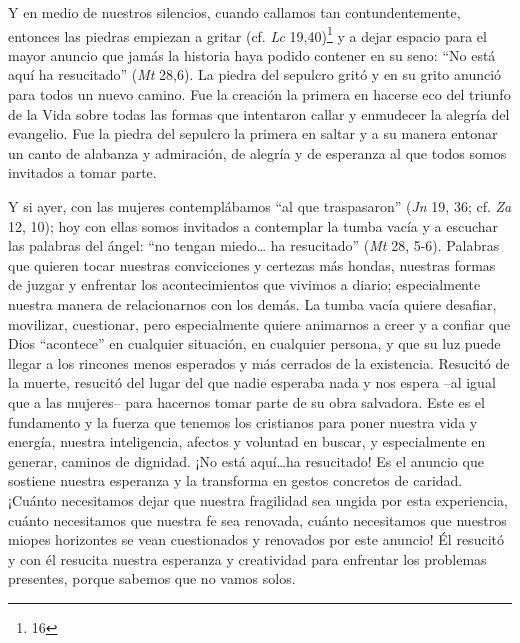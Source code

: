 			\begin{body}Y en medio de nuestros silencios, cuando callamos tan contundentemente, entonces las piedras empiezan a gritar (cf. \textit{Lc} 19,40)\footnote{16} y a dejar espacio para el mayor anuncio que jamás la historia haya podido contener en su seno: “No está aquí ha resucitado” (\textit{Mt} 28,6). La piedra del sepulcro gritó y en su grito anunció para todos un nuevo camino. Fue la creación la primera en hacerse eco del triunfo de la Vida sobre todas las formas que intentaron callar y enmudecer la alegría del evangelio. Fue la piedra del sepulcro la primera en saltar y a su manera entonar un canto de alabanza y admiración, de alegría y de esperanza al que todos somos invitados a tomar parte. \end{body}
			
			\begin{body}Y si ayer, con las mujeres contemplábamos “al que traspasaron” (\textit{Jn} 19, 36; cf. \textit{Za} 12, 10); hoy con ellas somos invitados a contemplar la tumba vacía y a escuchar las palabras del ángel: “no tengan miedo… ha resucitado” (\textit{Mt} 28, 5-6). Palabras que quieren tocar nuestras convicciones y certezas más hondas, nuestras formas de juzgar y enfrentar los acontecimientos que vivimos a diario; especialmente nuestra manera de relacionarnos con los demás. La tumba vacía quiere desafiar, movilizar, cuestionar, pero especialmente quiere animarnos a creer y a confiar que Dios “acontece” en cualquier situación, en cualquier persona, y que su luz puede llegar a los rincones menos esperados y más cerrados de la existencia. Resucitó de la muerte, resucitó del lugar del que nadie esperaba nada y nos espera –al igual que a las mujeres– para hacernos tomar parte de su obra salvadora. Este es el fundamento y la fuerza que tenemos los cristianos para poner nuestra vida y energía, nuestra inteligencia, afectos y voluntad en buscar, y especialmente en generar, caminos de dignidad. ¡No está aquí…ha resucitado! Es el anuncio que sostiene nuestra esperanza y la transforma en gestos concretos de caridad. ¡Cuánto necesitamos dejar que nuestra fragilidad sea ungida por esta experiencia, cuánto necesitamos que nuestra fe sea renovada, cuánto necesitamos que nuestros miopes horizontes se vean cuestionados y renovados por este anuncio! Él resucitó y con él resucita nuestra esperanza y creatividad para enfrentar los problemas presentes, porque sabemos que no vamos solos. \end{body}
			

